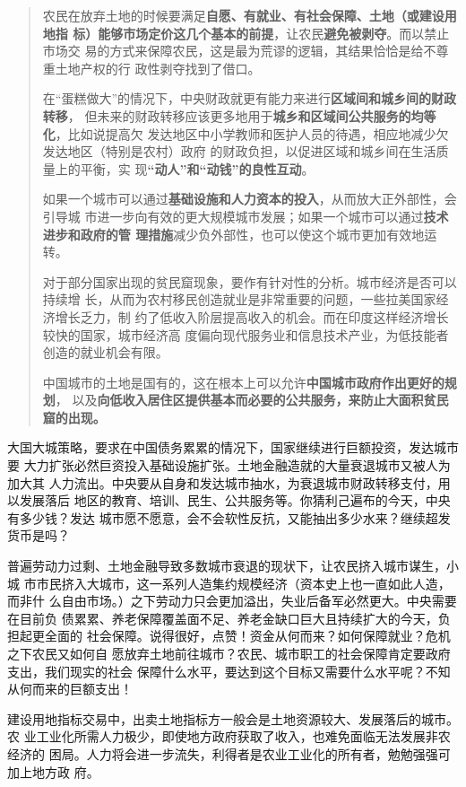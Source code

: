 \begin{enumerate}
\begin{quotation}
    农民在放弃土地的时候要满足\textbf{自愿、有就业、有社会保障、土地（或建设用地指
      标）能够市场定价这几个基本的前提}，让农民\textbf{避免被剥夺}。而以禁止市场交
    易的方式来保障农民，这是最为荒谬的逻辑，其结果恰恰是给不尊重土地产权的行
    政性剥夺找到了借口。

    在“蛋糕做大”的情况下，中央财政就更有能力来进行\textbf{区域间和城乡间的财政转移}，
    但未来的财政转移应该更多地用于\textbf{城乡和区域间公共服务的均等化}，比如说提高欠
    发达地区中小学教师和医护人员的待遇，相应地减少欠发达地区（特别是农村）政府
    的财政负担，以促进区域和城乡间在生活质量上的平衡，实
    现\textbf{“动人”和“动钱”的良性互动}。

    如果一个城市可以通过\textbf{基础设施和人力资本的投入}，从而放大正外部性，会引导城
    市进一步向有效的更大规模城市发展；如果一个城市可以通过\textbf{技术进步和政府的管
      理措施}减少负外部性，也可以使这个城市更加有效地运转。

    对于部分国家出现的贫民窟现象，要作有针对性的分析。城市经济是否可以持续增
    长，从而为农村移民创造就业是非常重要的问题，一些拉美国家经济增长乏力，制
    约了低收入阶层提高收入的机会。而在印度这样经济增长较快的国家，城市经济高
    度偏向现代服务业和信息技术产业，为低技能者创造的就业机会有限。

    中国城市的土地是国有的，这在根本上可以允许\textbf{中国城市政府作出更好的规划}，
    以及\textbf{向低收入居住区提供基本而必要的公共服务，来防止大面积贫民窟的出现。}
  \end{quotation}

  大国大城策略，要求在中国债务累累的情况下，国家继续进行巨额投资，发达城市要
  大力扩张必然巨资投入基础设施扩张。土地金融造就的大量衰退城市又被人为加大其
  人力流出。中央要从自身和发达城市抽水，为衰退城市财政转移支付，用以发展落后
  地区的教育、培训、民生、公共服务等。你猜利己遍布的今天，中央有多少钱？发达
  城市愿不愿意，会不会软性反抗，又能抽出多少水来？继续超发货币是吗？

  普遍劳动力过剩、土地金融导致多数城市衰退的现状下，让农民挤入城市谋生，小城
  市市民挤入大城市，这一系列人造集约规模经济（资本史上也一直如此人造，而非什
  么自由市场。）之下劳动力只会更加溢出，失业后备军必然更大。中央需要在目前负
  债累累、养老保障覆盖面不足、养老金缺口巨大且持续扩大的今天，负担起更全面的
  社会保障。说得很好，点赞！资金从何而来？如何保障就业？危机之下农民又如何自
  愿放弃土地前往城市？农民、城市职工的社会保障肯定要政府支出，我们现实的社会
  保障什么水平，要达到这个目标又需要什么水平呢？不知从何而来的巨额支出！

  建设用地指标交易中，出卖土地指标方一般会是土地资源较大、发展落后的城市。农
  业工业化所需人力极少，即使地方政府获取了收入，也难免面临无法发展非农经济的
  困局。人力将会进一步流失，利得者是农业工业化的所有者，勉勉强强可加上地方政
  府。


\end{enumerate}
